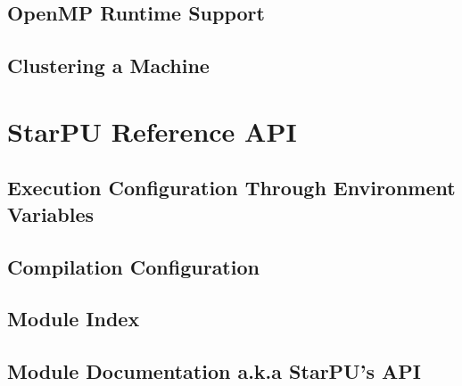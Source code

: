 \chapter{OpenMP Runtime Support}
\label{OpenMPRuntimeSupport}
\hypertarget{OpenMPRuntimeSupport}{}


\chapter{Clustering a Machine}
\label{ClusteringAMachine}
\hypertarget{ClusteringAMachine}{}


\part{StarPU Reference API}

\chapter{Execution Configuration Through Environment Variables}
\label{ExecutionConfigurationThroughEnvironmentVariables}
\hypertarget{ExecutionConfigurationThroughEnvironmentVariables}{}


\chapter{Compilation Configuration}
\label{CompilationConfiguration}
\hypertarget{CompilationConfiguration}{}


\chapter{Module Index}


\chapter{Module Documentation a.k.a StarPU's API}
\label{ModuleDocumentation}
\hypertarget{ModuleDocumentation}{}

